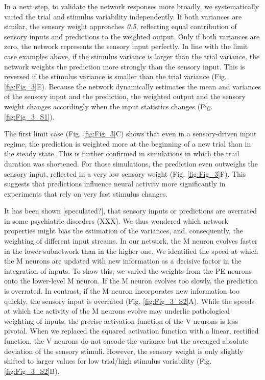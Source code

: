 \documentclass[10pt,a4paper,draft]{article}
\begin{document}
In a next step, to validate the network responses more broadly, we systematically varied the trial and stimulus variability independently. If both variances are similar, the sensory weight approaches \textit{0.5}, reflecting equal contribution of sensory inputs and predictions to the weighted output. Only if both variances are zero, the network represents the sensory input perfectly. In line with the limit case examples above, if the stimulus variance is larger than the trial variance, the network weights the prediction more strongly than the sensory input. This is reversed if the stimulus variance is smaller than the trial variance (Fig. \ref{fig:Fig_3}E). Because the network dynamically estimates the mean and variances of the sensory input and the prediction, the weighted output and the sensory weight changes accordingly when the input statistics changes (Fig. \ref{fig:Fig_3_S1}). 

The first limit case (Fig. \ref{fig:Fig_3}C) shows that even in a sensory-driven input regime, the prediction is weighted more at the beginning of a new trial than in the steady state. This is further confirmed in simulations in which the trail duration was shortened. For those simulations, the prediction even outweighs the sensory input, reflected in a very low sensory weight (Fig. \ref{fig:Fig_3}F). This suggests that predictions influence neural activity more significantly in experiments that rely on very fast stimulus changes. 

It has been shown [speculated?], that sensory inputs or predictions are overrated in some psychiatric disorders (XXX). We thus wondered which network properties might bias the estimation of the variances, and, consequently, the weighting of different input streams. In our network, the M neuron evolves faster in the lower subnetwork than in the higher one. We identified the speed at which the M neurons are updated with new information as a decisive factor in the integration of inputs. To show this, we varied the weights from the PE neurons onto the lower-level M neuron. If the M neuron evolves too slowly, the prediction is overrated. In contrast, if the M neuron incorporates new information too quickly, the sensory input is overrated (Fig. \ref{fig:Fig_3_S2}A). While the speeds at which the activity of the M neurons evolve may underlie pathological weighting of inputs, the precise activation function of the V neurons is less pivotal. When we replaced the squared activation function with a linear, rectified function, the V neurons do not encode the variance but the averaged absolute deviation of the sensory stimuli. However, the sensory weight is only slightly shifted to larger values for low trial/high stimulus variability (Fig. \ref{fig:Fig_3_S2}B). 
\end{document}
